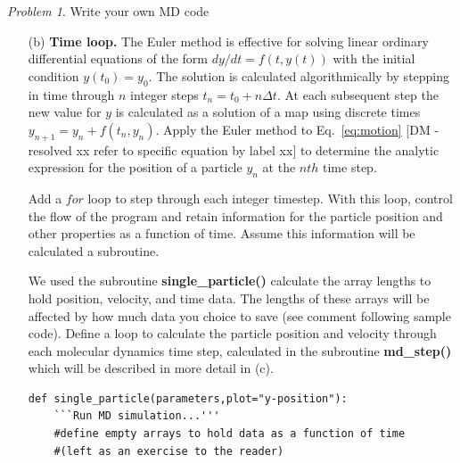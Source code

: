 \documentclass[preprint,showpacs,preprintnumbers,amsmath,amssymb,aps,prb]{revtex4-1}
\theoremstyle{remark}
\newtheorem{problem}{Problem}
\begin{document}
\begin{problem}{Write your own MD code}
\begin{enumerate}
\begin{verbatim}
    \end{verbatim}

    The function is called at the top of the main function
    followed by a call to a subroutine
    containing the MD algorithm.

     \begin{verbatim}
    if __name__ == "__main__":
        parameters = set_parameters()
        #run the MD simulation
        single_particle(parameters)

\end{verbatim}

    
   \item[(b)] {\bf Time loop.}
     The Euler method is effective
     for solving linear ordinary differential  equations
     of the form
     $dy/dt = f(t,y(t))$ with the initial condition $y(t_0) = y_0$.
     The solution is calculated algorithmically
     by stepping in time through $n$ integer steps
     $t_n = t_0 + n \Delta t$.
     At each subsequent step the new
     value for $y$ is calculated as a  solution of a map using
     discrete times 
     $y_{n+1} = y_n + f(t_n,y_n)$.
     Apply the Euler method to %
     Eq.~\ref{eq:motion}
     [DM - resolved xx refer to specific equation by label xx]
     to determine  the analytic expression
     for the position of a particle
     $y_n$ at the $nth$ time step.
  
     Add a $for$ loop
     to step through each integer timestep.
     With this loop, 
     control
     the flow of the program
     and retain information for the particle position and other
     properties
     as a function of time.
     Assume this information
     will be calculated a subroutine.
        
     We used the subroutine {\bf single\_particle()}
     calculate the array lengths to hold
     position, velocity, and time data.
     The lengths of these arrays will be affected by
     how much data you choice to save
     (see comment following sample code).
     Define a loop to 
     calculate the particle position and velocity through each
     molecular dynamics time step,
     calculated in the subroutine {\bf md\_step()}
     which will be described in more detail in (c).

\begin{verbatim}
def single_particle(parameters,plot="y-position"):
    ```Run MD simulation...'''    
    #define empty arrays to hold data as a function of time
    #(left as an exercise to the reader)   


\end{verbatim}
\end{enumerate}
\end{problem}
\end{document}
